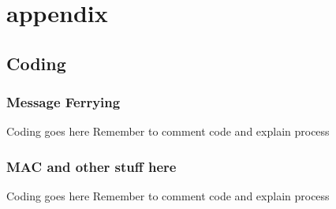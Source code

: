 \chapter{appendix} 

\section{Coding}
\subsection{Message Ferrying}

Coding goes here 
Remember to comment code and explain process

\subsection{MAC and other stuff here}

Coding goes here 
Remember to comment code and explain process